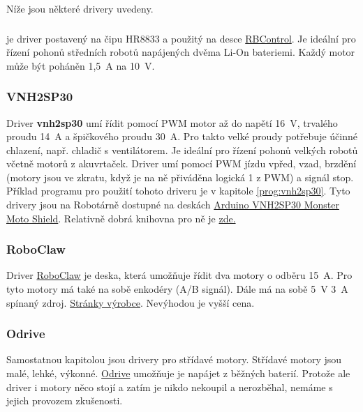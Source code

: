  Níže jsou některé drivery uvedeny. 
 
 \subsubsection{} %
 

\href{}{} je  driver postavený na čipu HR8833 a použitý na desce \hyperref[rbcontrol]{RBControl}. 
Je ideální pro řízení pohonů středních robotů napájených dvěma Li-On bateriemi. 
Každý motor může být poháněn 1,5~A na 10~V. 

 
 
 
\label{vnh2sp30} \subsubsection{VNH2SP30}
 
 Driver {\bf vnh2sp30}  umí řídit pomocí PWM motor až do napětí 16~V, trvalého proudu 14~A a špičkového proudu 30~A. Pro takto velké proudy potřebuje účinné chlazení, např. chladič s ventilátorem. Je ideální pro řízení pohonů velkých robotů včetně motorů z akuvrtaček. 
 Driver umí pomocí PWM jízdu vpřed, vzad, brzdění (motory jsou ve zkratu, když je na ně přiváděna logická 1 z PWM) a signál stop. 
 Příklad programu pro použití tohoto driveru je v kapitole \ref{prog:vnh2sp30}. 
  Tyto drivery jsou na Robotárně dostupné na deskách \href{https://github.com/sparkfun/Monster_Moto_Shield}{Arduino VNH2SP30 Monster Moto Shield}.
  Relativně dobrá knihovna pro ně je \href{ https://github.com/OliviliK/Arduino-Robot/tree/master/libraries/Vnh2sp30}{zde.} 
 
 
\subsubsection{RoboClaw}

Driver \href{https://www.pololu.com/product/3285}{RoboClaw} je deska, která umožňuje řídit dva motory o odběru 15~A. 
Pro tyto motory má také na sobě enkodéry (A/B signál). 
Dále má na sobě 5~V 3~A spínaný zdroj.
\href{http://www.ionmc.com/RoboClaw-2x15A-Motor-Controller_p_10.html}{Stránky výrobce}.
Nevýhodou je vyšší cena. 

\subsubsection{Odrive} 

Samostatnou kapitolou jsou drivery pro střídavé motory. 
Střídavé motory jsou malé, lehké, výkonné. 
\href{https://odriverobotics.com }{Odrive} umožňuje je napájet z běžných baterií. 
Protože ale driver i motory něco stojí  a zatím je nikdo nekoupil a nerozběhal, nemáme s jejich provozem zkušenosti. 


